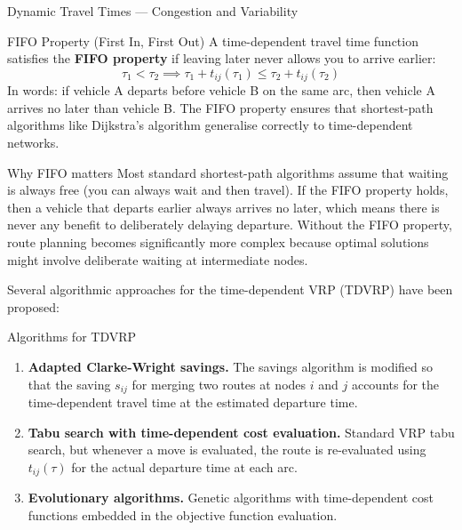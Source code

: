 \documentclass[aspectratio=169,10pt]{beamer}
\begin{document}
\begin{frame}[allowframebreaks]{Dynamic Travel Times — Congestion and Variability}
  \framebreak

  \begin{block}{FIFO Property (First In, First Out)}
    A time-dependent travel time function satisfies the \textbf{FIFO property}
    if leaving later never allows you to arrive earlier:
    \[
      \tau_1 < \tau_2 \implies \tau_1 + t_{ij}(\tau_1) \leq \tau_2 + t_{ij}(\tau_2)
    \]
    In words: if vehicle A departs before vehicle B on the same arc, then
    vehicle A arrives no later than vehicle B.  The FIFO property ensures
    that shortest-path algorithms like Dijkstra's algorithm generalise
    correctly to time-dependent networks.
  \end{block}

  \begin{alertblock}{Why FIFO matters}
    Most standard shortest-path algorithms assume that waiting is always
    free (you can always wait and then travel).  If the FIFO property holds,
    then a vehicle that departs earlier always arrives no later, which means
    there is never any benefit to deliberately delaying departure.  Without
    the FIFO property, route planning becomes significantly more complex
    because optimal solutions might involve deliberate waiting at intermediate
    nodes.
  \end{alertblock}

  \framebreak

  Several algorithmic approaches for the time-dependent VRP (TDVRP) have been
  proposed:

  \begin{block}{Algorithms for TDVRP}
    \begin{enumerate}
      \item \textbf{Adapted Clarke-Wright savings.}  The savings algorithm is
            modified so that the saving $s_{ij}$ for merging two routes at
            nodes $i$ and $j$ accounts for the time-dependent travel time
            at the estimated departure time.
      \item \textbf{Tabu search with time-dependent cost evaluation.}
            Standard VRP tabu search, but whenever a move is evaluated,
            the route is re-evaluated using $t_{ij}(\tau)$ for the actual
            departure time at each arc.
      \item \textbf{Evolutionary algorithms.}  Genetic algorithms with
            time-dependent cost functions embedded in the objective
            function evaluation.
    \end{enumerate}
  \end{block}


\end{frame}
\end{document}
